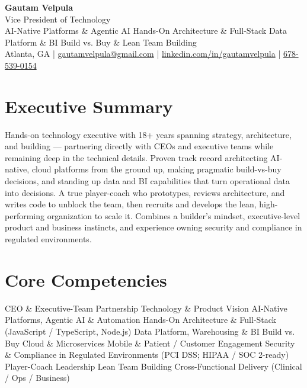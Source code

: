 \documentclass[11pt]{article}
\begin{document}
\begin{center}
    {\LARGE \textbf{Gautam Velpula}} \\[4pt]
    Vice President of Technology \\[6pt]
    AI-Native Platforms \& Agentic AI \textbullet{} Hands-On Architecture \& Full-Stack \textbullet{} Data Platform \& BI \textbullet{} Build vs. Buy \& Lean Team Building \\[6pt]
    Atlanta, GA \;|\;
    \href{mailto:gautamvelpula@gmail.com}{gautamvelpula@gmail.com} \;|\;
    \href{https://www.linkedin.com/in/gautamvelpula}{linkedin.com/in/gautamvelpula} \;|\;
    \href{tel:6785390154}{678-539-0154}
\end{center}

\vspace{8pt}

\section*{Executive Summary}
Hands-on technology executive with 18+ years spanning strategy, architecture, and building --- partnering directly with CEOs and executive teams while remaining deep in the technical details. Proven track record architecting AI-native, cloud platforms from the ground up, making pragmatic build-vs-buy decisions, and standing up data and BI capabilities that turn operational data into decisions. A true player-coach who prototypes, reviews architecture, and writes code to unblock the team, then recruits and develops the lean, high-performing organization to scale it. Combines a builder's mindset, executive-level product and business instincts, and experience owning security and compliance in regulated environments.

\section*{Core Competencies}
CEO \& Executive-Team Partnership \textbullet{} Technology \& Product Vision \textbullet{} AI-Native Platforms, Agentic AI \& Automation \textbullet{} Hands-On Architecture \& Full-Stack (JavaScript / TypeScript, Node.js) \textbullet{} Data Platform, Warehousing \& BI \textbullet{} Build vs. Buy \textbullet{} Cloud \& Microservices \textbullet{} Mobile \& Patient / Customer Engagement \textbullet{} Security \& Compliance in Regulated Environments (PCI DSS; HIPAA / SOC 2-ready) \textbullet{} Player-Coach Leadership \textbullet{} Lean Team Building \textbullet{} Cross-Functional Delivery (Clinical / Ops / Business)
\end{document}
